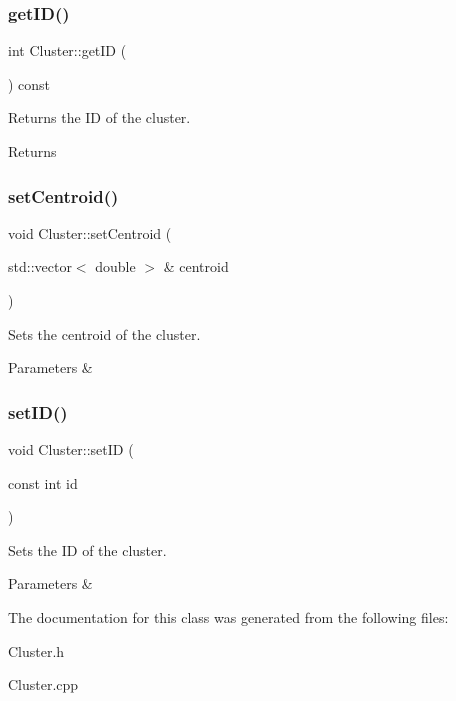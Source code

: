 \subsubsection{\texorpdfstring{get\+I\+D()}{getID()}}
{\footnotesize\ttfamily int Cluster\+::get\+ID (\begin{DoxyParamCaption}{ }\end{DoxyParamCaption}) const}

Returns the ID of the cluster. \begin{DoxyReturn}{Returns}

\end{DoxyReturn}
\mbox{\label{class_cluster_aec28970f0f25004db0e591032ad79d60}} 
\subsubsection{\texorpdfstring{set\+Centroid()}{setCentroid()}}
{\footnotesize\ttfamily void Cluster\+::set\+Centroid (\begin{DoxyParamCaption}\item[{std\+::vector$<$ double $>$ \&}]{centroid }\end{DoxyParamCaption})}

Sets the centroid of the cluster. 
\begin{DoxyParams}{Parameters}
{\em } & \\
\hline
\end{DoxyParams}
\mbox{\label{class_cluster_a0b0965324db24dc6dae04873ecef7156}} 
\subsubsection{\texorpdfstring{set\+I\+D()}{setID()}}
{\footnotesize\ttfamily void Cluster\+::set\+ID (\begin{DoxyParamCaption}\item[{const int}]{id }\end{DoxyParamCaption})}

Sets the ID of the cluster. 
\begin{DoxyParams}{Parameters}
{\em } & \\
\hline
\end{DoxyParams}


The documentation for this class was generated from the following files\+:\begin{DoxyCompactItemize}
\item 
Cluster.\+h\item 
Cluster.\+cpp\end{DoxyCompactItemize}
